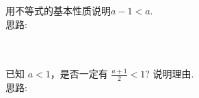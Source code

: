 \item {
    用不等式的基本性质说明$a-1<a$.
    \ifshowSolution
        \fangsong{}
        \\
        思路:
    \else
        \\ \\ \\
    \fi
}

\item {
    已知 $a<1$，是否一定有 $\frac{a+1}{2}<1$? 说明理由.
    \ifshowSolution
        \fangsong{}
        \\
        思路:
    \else
        \\ \\ \\
    \fi
}